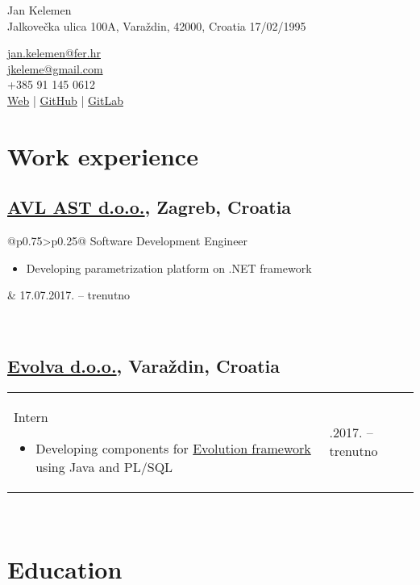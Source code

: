 \documentclass[a4paper]{article}
\makeatletter
\newlength{\tablewidth}
\newenvironment{period}[2]{%
\newcommand{\sarma}{#2}%
\setlength{\tablewidth}{\linewidth}
\addtolength{\tablewidth}{-2\tabcolsep}
\begin{tabular}{@{}p{0.75\tablewidth}>{\raggedleft\arraybackslash}p{0.25\tablewidth}@{}}%
#1 \newline
\begin{itemize}
}{%
\end{itemize} & \sarma \\%
\end{tabular}\\
}
\makeatother
\begin{document}
\fontfamily{\sfdefault}
\selectfont

\begin{minipage}{.5\textwidth}
\LARGE{Jan Kelemen}\\
\normalsize{Jalkove\v{c}ka ulica 100A, Vara\v{z}din, 42000, Croatia}
\normalsize{17/02/1995}
\end{minipage}%
\begin{minipage}{.5\textwidth}
\raggedleft
\href{mailto:jan.kelemen@fer.hr}{jan.kelemen@fer.hr} \\
\href{mailto:jkeleme@gmail.com}{jkeleme@gmail.com} \\
+385 91 145 0612 \\
\href{http://jan-kelemen.github.io/}{Web} | \href{https://github.com/jan-kelemen}{GitHub} | \href{https://gitlab.com/jan-kelemen}{GitLab}
\end{minipage}

\vspace{1em}

\section{Work experience}
\subsection{\href{https://www.avl.com/}{AVL AST d.o.o.}, Zagreb, Croatia}
\begin{period}{Software Development Engineer}{17.07.2017. -- trenutno}
	\item
		Developing parametrization platform on .NET framework
\end{period}
\subsection{\href{http://www.evolva.hr/hr/index.html}{Evolva d.o.o.}, Vara\v{z}din, Croatia}
\begin{period}{Intern}{22.08.2016. -- 23.09.2016.}
	\item
		Developing components for \href{http://www.evolution-framework.com/}{Evolution framework} using Java and PL/SQL
\end{period}

\section{Education}
\end{document}
